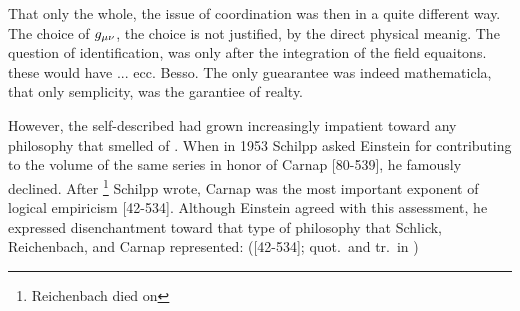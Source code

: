 \documentclass[draft]{article}
\begin{document}
That only the whole, the issue of coordination was then in a quite different way. The choice of $g_{\mu\nu}$, the choice is not justified, by the direct physical meanig. The question of identification, was only after the integration of the field equaitons. these would have ... ecc. Besso. The only guearantee was indeed mathematicla, that only semplicity, was the garantiee of realty. 

However, the self-described  had grown increasingly impatient toward any philosophy that smelled of  \citep[13]{Einstein1950c}. When in 1953 Schilpp asked Einstein for contributing to the volume of the same series in honor of Carnap [80-539], he famously declined. After \footnote{Reichenbach died on } Schilpp wrote, Carnap was the most important exponent of logical empiricism [42-534]. Although Einstein agreed with this assessment, he expressed disenchantment toward that type of philosophy that Schlick, Reichenbach, and Carnap represented:  ([42-534]; quot.\ and tr.\ in \cite[374]{Howard1990})




\printshorthands
\printbibliography
\end{document}
